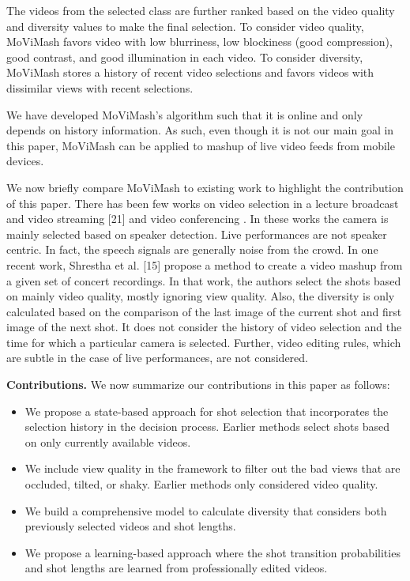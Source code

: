 \documentclass{clsfile}
\begin{document}
The videos from the selected class are further ranked based on the video quality and diversity values to make the final selection. To consider video quality, MoViMash favors video with low blurriness, low blockiness (good compression), good contrast, and good illumination in each video. To consider diversity, MoViMash stores a history of recent video selections and favors videos with dissimilar views with recent selections.

We have developed MoViMash’s algorithm such that it is online and only depends on history information. As such, even though it is not our main goal in this paper, MoViMash can be applied to mashup of live video feeds from mobile devices.

We now briefly compare MoViMash to existing work to highlight the contribution of this paper. There has been few works on video selection in a lecture broadcast and video streaming [21] \cite{coddington1955theory} and video conferencing \cite{barbu1976nonlinear}. In these works the camera is mainly selected based on speaker detection. Live performances are not speaker centric. In fact, the speech signals are generally noise from the crowd. In one recent work, Shrestha et al. [15] propose a method to create a video mashup from a given set of concert recordings. In that work, the authors select the shots based on mainly video quality, mostly ignoring view quality. Also, the diversity is only calculated based on the comparison of the last image of the current shot and first image of the next shot. It does not consider the history of video selection and the time for which a particular camera is selected. Further, video editing rules, which are subtle in the case of live performances, are not considered.

\textbf{Contributions.} We now summarize our contributions in this paper as follows:
\begin{itemize}
\item We propose a state-based approach for shot selection that incorporates the selection history in the decision process. Earlier methods select shots based on only currently available videos.
\item We include view quality in the framework to filter out the bad views that are occluded, tilted, or shaky. Earlier methods only considered video quality.
\item We build a comprehensive model to calculate diversity that considers both previously selected videos and shot lengths.
\item We propose a learning-based approach where the shot transition probabilities and shot lengths are learned from professionally edited videos.
\end{itemize}
\end{document}
